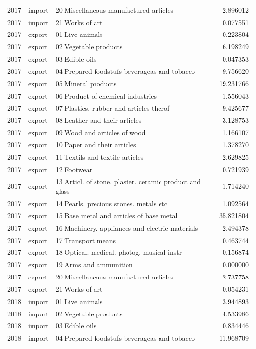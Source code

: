\begin{tabular}{rllr}
2017 & import & 20 Miscellaneous manufactured articles & 2.896012 \\
2017 & import & 21 Works of art & 0.077551 \\
2017 & export & 01 Live animals & 0.223804 \\
2017 & export & 02 Vegetable products & 6.198249 \\
2017 & export & 03 Edible oils & 0.047353 \\
2017 & export & 04 Prepared foodstufs beverageas and tobacco & 9.756620 \\
2017 & export & 05 Mineral products & 19.231766 \\
2017 & export & 06 Product of chemical industries & 1.556043 \\
2017 & export & 07 Plastics. rubber and articles therof & 9.425677 \\
2017 & export & 08 Leather and their articles & 3.128753 \\
2017 & export & 09 Wood and articles of wood & 1.166107 \\
2017 & export & 10 Paper and their articles & 1.378270 \\
2017 & export & 11 Textils and textile articles & 2.629825 \\
2017 & export & 12 Footwear & 0.721939 \\
2017 & export & 13 Articl. of stone. plaster. ceramic product and glass & 1.714240 \\
2017 & export & 14 Pearls. precious stones. metals etc & 1.092564 \\
2017 & export & 15 Base metal and articles of base metal & 35.821804 \\
2017 & export & 16 Machinery. appliances and electric materials & 2.494378 \\
2017 & export & 17 Transport means & 0.463744 \\
2017 & export & 18 Optical. medical. photog. musical instr & 0.156874 \\
2017 & export & 19 Arms and ammunition & 0.000000 \\
2017 & export & 20 Miscellaneous manufactured articles & 2.737758 \\
2017 & export & 21 Works of art & 0.054231 \\
2018 & import & 01 Live animals & 3.944893 \\
2018 & import & 02 Vegetable products & 4.533986 \\
2018 & import & 03 Edible oils & 0.834446 \\
2018 & import & 04 Prepared foodstufs beverageas and tobacco & 11.968709 \\

\end{tabular}
